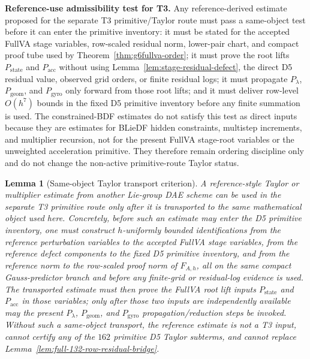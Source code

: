 \documentclass[preprint,12pt]{elsarticle}
\newtheorem{lemma}{Lemma}
\begin{document}
\noindent\textbf{Reference-use admissibility test for T3.}
Any reference-derived estimate proposed for the separate T3
primitive/Taylor route must pass a same-object test before it can enter the
primitive inventory: it must be stated for the accepted FullVA stage variables, row-scaled
residual norm, lower-pair chart, and compact proof tube used by
Theorem~\ref{thm:g6fullva-order}; it must prove the root lifts
\(P_{\mathrm{state}}\) and \(P_{\mathrm{acc}}\) without using
Lemma~\ref{lem:stage-residual-defect}, the direct D5 residual value, observed
grid orders, or finite residual logs; it must propagate
\(P_{\lambda}\), \(P_{\mathrm{geom}}\), and \(P_{\mathrm{gyro}}\) only
forward from those root lifts; and it must deliver row-level \(O(h^7)\)
bounds in the fixed D5 primitive inventory before any finite summation is
used.  The constrained-BDF estimates do not satisfy this test as direct
inputs because they are estimates for BLieDF hidden constraints, multistep
increments, and multiplier recursion, not for the present FullVA stage-root
variables or the unweighted acceleration primitive.  They therefore remain
ordering discipline only and do not change the non-active primitive-route
Taylor status.

\begin{lemma}[Same-object Taylor transport criterion]
\label{lem:same-object-taylor-transport-gate}
A reference-style Taylor or multiplier estimate from another Lie-group DAE
scheme can be used in the separate T3 primitive route only after it is
transported to the same mathematical object used here.  Concretely, before
such an estimate may enter the D5 primitive inventory, one must construct
\(h\)-uniformly bounded identifications from the reference perturbation
variables to the accepted FullVA stage variables, from the reference defect
components to the fixed D5 primitive inventory, and from the reference norm
to the row-scaled proof norm of \(F_{A,h}\), all on the same compact
Gauss-predictor branch and before any finite-grid or residual-log evidence is
used.  The transported estimate must then prove the FullVA root lift inputs
\(P_{\mathrm{state}}\) and \(P_{\mathrm{acc}}\) in those variables; only after
those two inputs are independently available may the present \(P_{\lambda}\),
\(P_{\mathrm{geom}}\), and \(P_{\mathrm{gyro}}\) propagation/reduction steps
be invoked.  Without such a same-object transport, the reference estimate is
not a T3 input, cannot certify any of the \(162\) primitive D5 Taylor
subterms, and cannot replace Lemma~\ref{lem:full-132-row-residual-bridge}.
\end{lemma}
\end{document}
